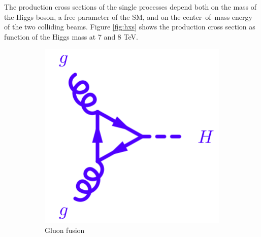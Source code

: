 The production cross sections of the single processes depend both on the mass of the Higgs boson, a free parameter of the SM, and on the center--of--mass energy of the two colliding beams. Figure \ref{fig:hxs} shows the production cross section as function of the Higgs mass at 7 and 8 TeV.

\begin{figure}
        \centering
        \begin{subfigure}[b]{0.3\textwidth}
                \includegraphics[width=\textwidth]{1_Introduction_Th_and_Exp/pics/ggFusion.png}
                \caption{Gluon fusion}
                \label{fig:ggf}
        \end{subfigure}%
        ~ 
        \begin{subfigure}[b]{0.3\textwidth}

\end{subfigure}
\end{figure}
